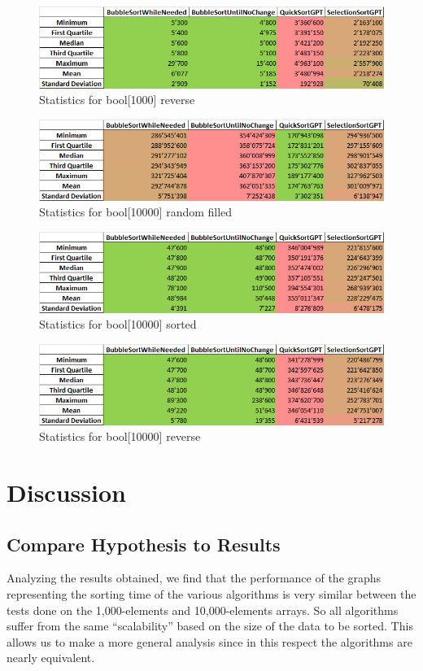 \documentclass{article}
\begin{document}
\begin{figure}[!h]
    \centering
    \includegraphics[width=0.75\linewidth]{bool1000rev-stat.png}
    \caption{Statistics for bool[1000] reverse}
    \label{fig:bool1000rev-stat}
\end{figure}
\begin{figure}[!h]
    \centering
    \includegraphics[width=0.75\linewidth]{bool10000rand-stat.png}
    \caption{Statistics for bool[10000] random filled}
    \label{fig:bool10000rand-stat}
\end{figure}
\begin{figure}[!h]
    \centering
    \includegraphics[width=0.75\linewidth]{bool10000sort-stat.png}
    \caption{Statistics for bool[10000] sorted}
    \label{fig:bool10000sort-stat}
\end{figure}
\begin{figure}[!h]
    \centering
    \includegraphics[width=0.75\linewidth]{bool10000rev-stat.png}
    \caption{Statistics for bool[10000] reverse}
    \label{fig:bool10000rev-stat}
\end{figure}

\clearpage
\newpage

\section{Discussion}
\subsection{Compare Hypothesis to Results}
Analyzing the results obtained, we find that the performance of the graphs representing the sorting time of the various algorithms is very similar between the tests done on the 1,000-elements and 10,000-elements arrays. So all algorithms suffer from the same “scalability” based on the size of the data to be sorted. This allows us to make a more general analysis since in this respect the algorithms are nearly equivalent.\\
\end{document}
